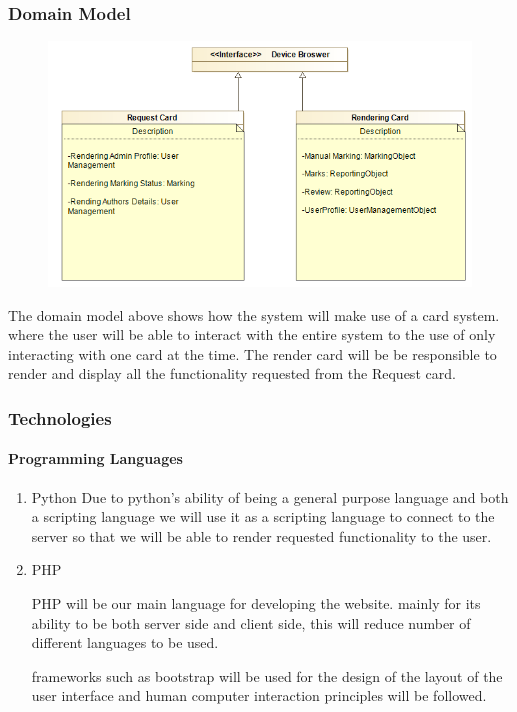 \documentclass{article}
\begin{document}
		\subsubsection{Domain Model}
			\begin{figure}[H]
			\centering
				\includegraphics[width=450px]{Images/Access_Module/Pictures/Access_module_Class_diagram}
			\end{figure}
			
			\par The domain model above shows how the system will make use of a card system. where the user will be able 
			to interact with the entire system to the use of only interacting with one card at the time. The render 
			card will be be responsible to render and display all the functionality requested from the Request card.
		
			
		\subsubsection{Technologies}
			\paragraph{Programming Languages}
				\begin{enumerate}
 					 \item Python
 					 		Due to python's ability of being a general purpose language and both a scripting language
 					 		we will use it as a scripting language to connect to the server so that we will be able to
 					 		render requested functionality to the user.
  						\item PHP
  							\par PHP will be our main language for developing the website. mainly for its ability to be both 	
  							server side and client side, this will reduce number of different languages to be used.
  							
  							\par frameworks such as bootstrap will be used for the design of the 
  							layout of the user interface and human
  							computer interaction principles will be followed.
				\end{enumerate}
				
\end{document}
